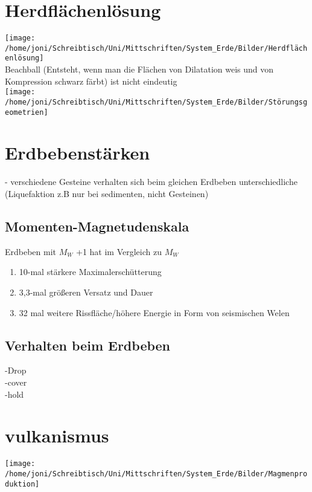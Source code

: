\documentclass[a4,12pt]{scrreprt}
\begin{document}
\section{Herdflächenlösung}

\texttt{[image: /home/joni/Schreibtisch/Uni/Mittschriften/System\_Erde/Bilder/Herdflächenlösung]}\\

Beachball (Entsteht, wenn man die Flächen von Dilatation weis und von Kompression schwarz färbt) ist nicht eindeutig\\

\texttt{[image: /home/joni/Schreibtisch/Uni/Mittschriften/System\_Erde/Bilder/Störungsgeometrien]}\\

\section{Erdbebenstärken}
- verschiedene Gesteine verhalten sich beim gleichen Erdbeben unterschiedliche (Liquefaktion z.B nur bei sedimenten, nicht Gesteinen)

\subsection{Momenten-Magnetudenskala}

Erdbeben mit $M_W$ +1 hat im Vergleich zu $M_W$
\begin{enumerate}
\item 10-mal stärkere Maximalerschütterung
\item 3,3-mal größeren Versatz und Dauer
\item 32 mal weitere Rissfläche/höhere Energie in Form von seismischen Welen
\end{enumerate}

\subsection{Verhalten beim Erdbeben}
-Drop\\
-cover\\
-hold\\
\section{vulkanismus}

\texttt{[image: /home/joni/Schreibtisch/Uni/Mittschriften/System\_Erde/Bilder/Magmenproduktion]}\\
\end{document}
